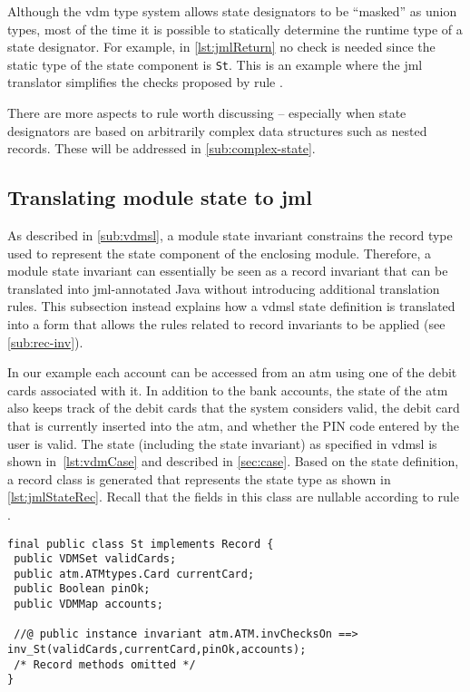 Although the \ac{vdm} type system allows state designators to be
``masked'' as union types, most of the time it is possible to
statically determine the runtime type of a state de\-sig\-na\-tor. For
example, in \autoref{lst:jmlReturn} no  check is needed
since the static type of the state component is \texttt{St}. This is
an example where the \ac{jml} translator simplifies the checks proposed
by rule .

There are more aspects to rule  worth discussing --
especially when state designators are based on arbitrarily complex
data structures such as nested records. These will be addressed in
\autoref{sub:complex-state}.

\subsection{Translating module state to \ac{jml}}

As described in \autoref{sub:vdmsl}, a module state invariant
constrains the record type used to represent the state component of
the enclosing module. Therefore, a module state invariant can
essentially be seen as a record invariant that can be translated into
\ac{jml}-annotated Java without introducing additional translation
rules. This subsection instead explains how a \ac{vdmsl} state
definition is translated into a form that allows the rules related to
record invariants to be applied (see \autoref{sub:rec-inv}).

In our example each account can be accessed from an \ac{atm} using one
of the debit cards associated with it. In addition to the bank
accounts, the state of the \ac{atm} also keeps track of the debit
cards that the system considers valid, the debit card that is
currently inserted into the \ac{atm}, and wheth\-er the PIN code entered
by the user is valid. The state (including the state invariant) as
specified in \ac{vdmsl} is shown in~\autoref{lst:vdmCase} and
described in \autoref{sec:case}. Based on the state definition, a
record class is generated that represents the state type as shown in
\autoref{lst:jmlStateRec}. Recall that the fields in this class are
nullable according to rule .

\begin{lstlisting}[style=customJml,caption={The record class used to represent the state type.},label={lst:jmlStateRec}]
final public class St implements Record {
 public VDMSet validCards;
 public atm.ATMtypes.Card currentCard;
 public Boolean pinOk;
 public VDMMap accounts;

 //@ public instance invariant atm.ATM.invChecksOn ==> inv_St(validCards,currentCard,pinOk,accounts);
 /* Record methods omitted */ 
}
\end{lstlisting}

